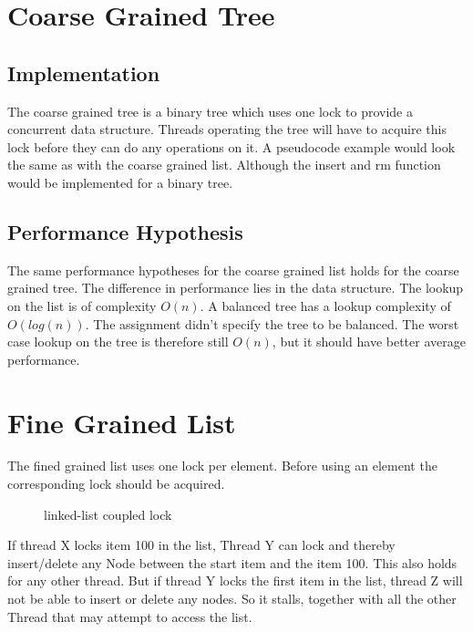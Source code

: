 \documentclass[10pt,a4paper]{article}
\begin{document}
\section{Coarse Grained Tree}
\subsection{Implementation}
The coarse grained tree is a binary tree which uses one lock to provide a concurrent data structure. Threads operating the tree will have to acquire this lock before they can do any operations on it. A pseudocode example would look the same as with the coarse grained list. Although the insert and rm function would be implemented for a binary tree.

\subsection{Performance Hypothesis}
The same performance hypotheses for the coarse grained list holds for the coarse grained tree. The difference in performance lies in the data structure. The lookup on the list is of complexity $O(n)$. A balanced tree has a lookup complexity of $O(log(n))$. The assignment didn't specify the tree to be balanced. The worst case lookup on the tree is therefore still $O(n)$, but it should have better average performance.

\section{Fine Grained List}
The fined grained list uses one lock per element. Before using an element the corresponding lock should be acquired.

\begin{figure}[h]
\centerline{
}
\caption{linked-list coupled lock}
\end{figure}

If thread X locks item 100 in the list, Thread Y can lock and thereby
insert/delete any Node between the start item and the item 100. This
also holds for any other thread. But if thread Y locks the first item in the
list, thread Z will not be able to insert or delete any nodes. So it stalls,
together with all the other Thread that may attempt to access the list.
\end{document}
